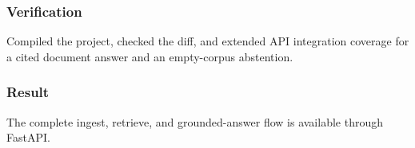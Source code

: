 \subsubsection{Verification}

Compiled the project, checked the diff, and extended API integration coverage for a cited document answer and an empty-corpus abstention.

\subsubsection{Result}

The complete ingest, retrieve, and grounded-answer flow is available through FastAPI.

